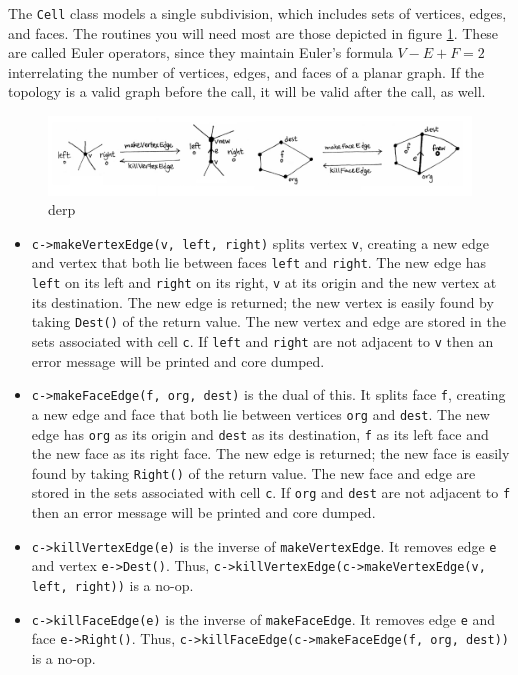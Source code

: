 The \texttt{Cell} class models a single subdivision, which includes sets of
vertices, edges, and faces. The routines you will need most are those depicted
in figure \ref{fig:quadedge-cell-api}. These are called Euler operators, since
they maintain Euler's formula $V-E+F=2$ interrelating the number of vertices,
edges, and faces of a planar graph. If the topology is a valid graph before the
call, it will be valid after the call, as well.

\begin{figure}[h]
	\centering
	\includegraphics[width=\textwidth]{figures/quadedge-cell-api} 
	\caption{derp}
	\label{fig:quadedge-cell-api} 
\end{figure}

\begin{itemize}
  \item \texttt{c->makeVertexEdge(v, left, right)} splits vertex \texttt{v},
  creating a new edge and vertex that both lie between faces \texttt{left} and
  \texttt{right}. The new edge has \texttt{left} on its left and \texttt{right}
  on its right, \texttt{v} at its origin and the new vertex at its destination.
  The new edge is returned; the new vertex is easily found by taking
  \texttt{Dest()} of the return value. The new vertex and edge are stored in the
  sets associated with cell \texttt{c}. If \texttt{left} and \texttt{right} are
  not adjacent to \texttt{v} then an error message will be printed and core
  dumped.
  \item \texttt{c->makeFaceEdge(f, org, dest)} is the dual of this. It splits
  face \texttt{f}, creating a new edge and face that both lie between vertices
  \texttt{org} and \texttt{dest}. The new edge has \texttt{org} as its origin
  and \texttt{dest} as its destination, \texttt{f} as its left face and the new
  face as its right face. The new edge is returned; the new face is easily found
  by taking \texttt{Right()} of the return value. The new face and edge are
  stored in the sets associated with cell \texttt{c}. If \texttt{org} and
  \texttt{dest} are not adjacent to \texttt{f} then an error message will be
  printed and core dumped.
  \item \texttt{c->killVertexEdge(e)} is the inverse of \texttt{makeVertexEdge}.
  It removes edge \texttt{e} and vertex \texttt{e->Dest()}. Thus,
  \texttt{c->killVertexEdge(c->makeVertexEdge(v, left, right))} is a no-op.
  \item \texttt{c->killFaceEdge(e)} is the inverse of \texttt{makeFaceEdge}. It
  removes edge \texttt{e} and face \texttt{e->Right()}. Thus,
  \texttt{c->killFaceEdge(c->makeFaceEdge(f, org, dest))} is a no-op.
\end{itemize}






